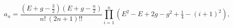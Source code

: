 \begin{equation}
a_n = \frac{\left(E + g - \tfrac{3}{2} \right) \left(E+g-\tfrac{n}{2}
\right)}{n!~(2n+1)!!}
\prod_{i=1}^{n} \left(E^2-E+ 2g - g^2 + \tfrac{1}{4} - \left(i+1
\right)^2 \right),
\end{equation}

